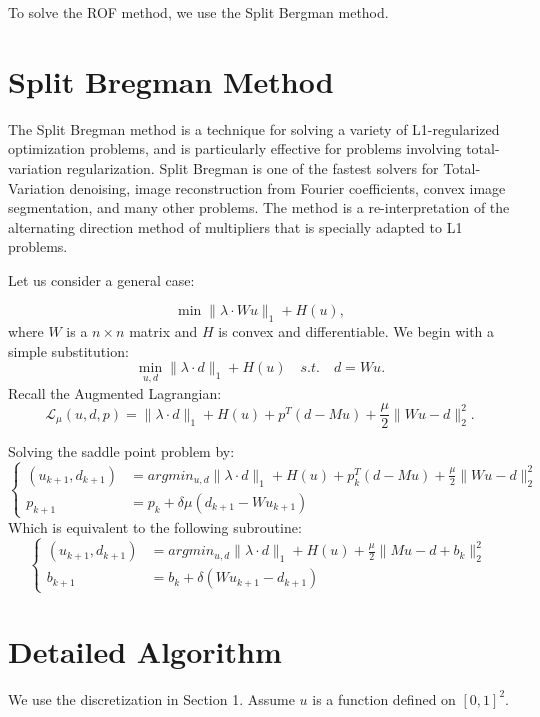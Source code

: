 \documentclass{article}
\begin{document}
To solve the ROF method, we use the Split Bergman method.

\section{Split Bregman Method}
The Split Bregman method is a technique for solving a variety of L1-regularized optimization problems, and is particularly effective for problems involving total-variation regularization.  Split Bregman is one of the fastest solvers for Total-Variation denoising, image reconstruction from Fourier coefficients, convex image segmentation, and many other problems.  The method is a re-interpretation of the alternating direction method of multipliers that is specially adapted to L1 problems.   

Let us consider a general case:

\begin{equation}
\min \|\lambda \cdot Wu\|_1 + H(u),
\end{equation}
where $W$ is a $n\times n$ matrix and $H$ is convex and differentiable. We begin with a simple substitution:
$$\min_{u,d} \|\lambda \cdot d\|_1 + H(u)\quad s.t. \quad d = Wu.$$
Recall the Augmented Lagrangian:
$$\mathcal{L}_{\mu}(u,d,p) = \|\lambda \cdot d\|_1 + H(u) + p^T(d-Mu) + \frac{\mu}{2}\|Wu-d\|_2^2.$$

Solving the saddle point problem by:
$$\left\{
\begin{array}{rl}
(u_{k+1},d_{k+1}) &= argmin_{u,d}\|\lambda \cdot d\|_1 + H(u) + p_k^T(d-Mu) + \frac{\mu}{2}\|Wu-d\|_2^2\\
p_{k+1} &= p_k + \delta\mu(d_{k+1} - Wu_{k+1})
\end{array}
\right.
$$
Which is equivalent to the following subroutine:
$$\left\{
\begin{array}{rl}
(u_{k+1},d_{k+1}) &= argmin_{u,d}\|\lambda \cdot d\|_1 + H(u) +  \frac{\mu}{2}\|Mu-d+b_k\|_2^2\\
b_{k+1} &= b_k + \delta(Wu_{k+1} - d_{k+1})
\end{array}
\right.
$$

\section{Detailed Algorithm}

We use the discretization in Section 1. Assume $u$ is a function defined on $[0,1]^2$.
\end{document}
